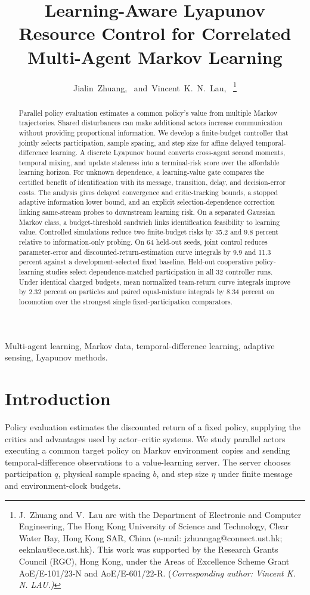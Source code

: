 \documentclass[journal]{IEEEtran}
\title{Learning-Aware Lyapunov Resource Control for Correlated Multi-Agent Markov Learning}
\author{Jialin~Zhuang,~\IEEEmembership{Member,~IEEE,}
and~Vincent~K.~N.~Lau,~\IEEEmembership{Fellow,~IEEE}%
\thanks{J.~Zhuang and V.~Lau are with the Department of Electronic and Computer Engineering, The Hong Kong University of Science and Technology, Clear Water Bay, Hong Kong SAR, China (e-mail: \mbox{jzhuangag@connect.ust.hk}; \mbox{eeknlau@ece.ust.hk}).
This work was supported by the Research Grants Council (RGC), Hong Kong, under the Areas of Excellence Scheme Grant AoE/E-101/23-N and AoE/E-601/22-R.
(\em{Corresponding author: Vincent K. N. LAU}.)}
}
\begin{document}
\maketitle
\begin{abstract}
Parallel policy evaluation estimates a common policy's value from multiple Markov trajectories.
Shared disturbances can make additional actors increase communication without providing proportional information.
We develop a finite-budget controller that jointly selects participation, sample spacing, and step size for affine delayed temporal-difference learning.
A discrete Lyapunov bound converts cross-agent second moments, temporal mixing, and update staleness into a terminal-risk score over the affordable learning horizon.
For unknown dependence, a learning-value gate compares the certified benefit of identification with its message, transition, delay, and decision-error costs.
The analysis gives delayed convergence and critic-tracking bounds, a stopped adaptive information lower bound, and an explicit selection-dependence correction linking same-stream probes to downstream learning risk.
On a separated Gaussian Markov class, a budget-threshold sandwich links identification feasibility to learning value.
Controlled simulations reduce two finite-budget risks by 35.2 and 9.8 percent relative to information-only probing.
On 64 held-out seeds, joint control reduces parameter-error and discounted-return-estimation curve integrals by 9.9 and 11.3 percent against a development-selected fixed baseline.
Held-out cooperative policy-learning studies select dependence-matched participation in all 32 controller runs.
Under identical charged budgets, mean normalized team-return curve integrals improve by 2.32 percent on particles and paired equal-mixture integrals by 8.34 percent on locomotion over the strongest single fixed-participation comparators.
\end{abstract}
\begin{IEEEkeywords}
Multi-agent learning, Markov data, temporal-difference learning, adaptive sensing, Lyapunov methods.
\end{IEEEkeywords}

\section{Introduction}
Policy evaluation estimates the discounted return of a fixed policy, supplying the critics and advantages used by actor--critic systems.
We study parallel actors executing a common target policy on Markov environment copies and sending temporal-difference observations to a value-learning server.
The server chooses participation $q$, physical sample spacing $b$, and step size $\eta$ under finite message and environment-clock budgets.
\end{document}
